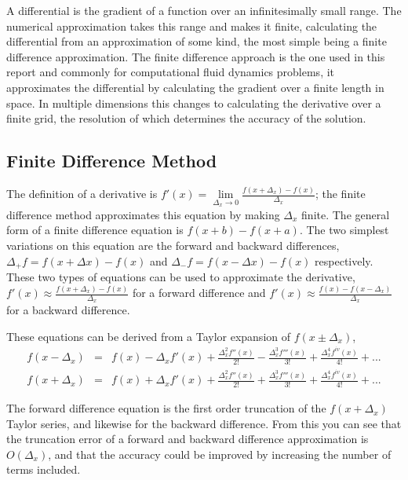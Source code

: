 A differential is the gradient of a function over an infinitesimally small range.
The numerical approximation takes this range and makes it finite, calculating the differential from an approximation of some kind, the most simple being a finite difference approximation.
The finite difference approach is the one used in this report and commonly for computational fluid dynamics problems, it approximates the differential by calculating the gradient over a finite length in space.
In multiple dimensions this changes to calculating the derivative over a finite grid, the resolution of which determines the accuracy of the solution.




\subsection{Finite Difference Method}

The definition of a derivative is $f'(x)=\lim\limits _{\Delta_{x}\to0}\frac{f(x+\Delta_{x})-f(x)}{\Delta_{x}}$; the finite difference method approximates this equation by making $\Delta_{x}$ finite.
The general form of a finite difference equation is $f(x+b)-f(x+a)$. The two simplest variations on this equation are the forward and backward differences, $\Delta_{+}f=f(x+\Delta x)-f(x)$ and $\Delta_{-}f=f(x-\Delta x)-f(x)$ respectively.
These two types of equations can be used to approximate the derivative, $f'(x)\approx\frac{f(x+\Delta_{x})-f(x)}{\Delta_{x}}$ for a forward difference and $f'(x)\approx\frac{f(x)-f(x-\Delta_{x})}{\Delta_{x}}$ for a backward difference.

These equations can be derived from a Taylor expansion of $f(x\pm\Delta_{x})$,
\begin{eqnarray}
f(x-\Delta_{x}) & = & f(x)-\Delta_{x}f'(x)+\frac{\Delta_{x}^{2}f''(x)}{2!}-\frac{\Delta_{x}^{3}f'''(x)}{3!}+\frac{\Delta_{x}^{4}f^{iv}(x)}{4!}+...\label{eq:TaylorForward}\\
f(x+\Delta_{x}) & = & f(x)+\Delta_{x}f'(x)+\frac{\Delta_{x}^{2}f''(x)}{2!}+\frac{\Delta_{x}^{3}f'''(x)}{3!}+\frac{\Delta_{x}^{4}f^{iv}(x)}{4!}+...\label{eq:TaylorBackward}
\end{eqnarray}


The forward difference equation is the first order truncation of the $f(x+\Delta_{x})$ Taylor series, and likewise for the backward difference.
From this you can see that the truncation error of a forward and backward difference approximation is $O(\Delta_{x})$, and that the accuracy could be improved by increasing the number of terms included.

